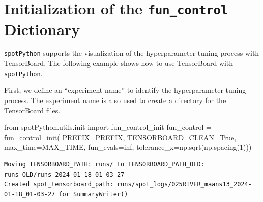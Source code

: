 \documentclass[
  letterpaper,
  DIV=11,
  numbers=noendperiod]{scrreprt}
\newenvironment{Shaded}{\begin{snugshade}}{\end{snugshade}}
\newcommand{\DecValTok}[1]{\textcolor[rgb]{0.68,0.00,0.00}{#1}}
\newcommand{\ImportTok}[1]{\textcolor[rgb]{0.00,0.46,0.62}{#1}}
\newcommand{\NormalTok}[1]{\textcolor[rgb]{0.00,0.23,0.31}{#1}}
\newcommand{\OperatorTok}[1]{\textcolor[rgb]{0.37,0.37,0.37}{#1}}
\newcommand{\VariableTok}[1]{\textcolor[rgb]{0.07,0.07,0.07}{#1}}
\begin{document}
\section{\texorpdfstring{Initialization of the \texttt{fun\_control}
Dictionary}{Initialization of the fun\_control Dictionary}}\label{initialization-of-the-fun_control-dictionary-1}

\texttt{spotPython} supports the visualization of the hyperparameter
tuning process with TensorBoard. The following example shows how to use
TensorBoard with \texttt{spotPython}.

First, we define an ``experiment name'' to identify the hyperparameter
tuning process. The experiment name is also used to create a directory
for the TensorBoard files.

\begin{Shaded}
\begin{Highlighting}[]
\ImportTok{from}\NormalTok{ spotPython.utils.init }\ImportTok{import}\NormalTok{ fun\_control\_init}
\NormalTok{fun\_control }\OperatorTok{=}\NormalTok{ fun\_control\_init(}
\NormalTok{    PREFIX}\OperatorTok{=}\NormalTok{PREFIX,}
\NormalTok{    TENSORBOARD\_CLEAN}\OperatorTok{=}\VariableTok{True}\NormalTok{,}
\NormalTok{    max\_time}\OperatorTok{=}\NormalTok{MAX\_TIME,}
\NormalTok{    fun\_evals}\OperatorTok{=}\NormalTok{inf,}
\NormalTok{    tolerance\_x}\OperatorTok{=}\NormalTok{np.sqrt(np.spacing(}\DecValTok{1}\NormalTok{)))}
\end{Highlighting}
\end{Shaded}

\begin{verbatim}
Moving TENSORBOARD_PATH: runs/ to TENSORBOARD_PATH_OLD: runs_OLD/runs_2024_01_18_01_03_27
Created spot_tensorboard_path: runs/spot_logs/025RIVER_maans13_2024-01-18_01-03-27 for SummaryWriter()
\end{verbatim}
\end{document}
